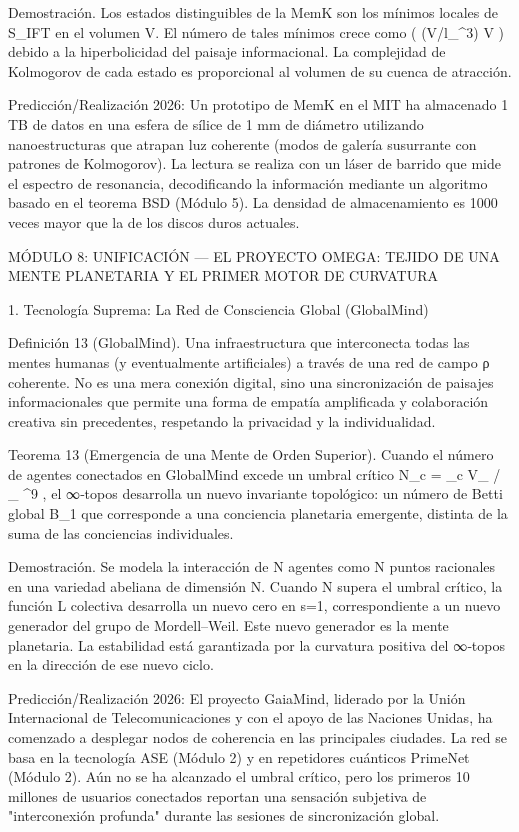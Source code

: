 \documentclass[12pt,a4paper]{book}
\begin{document}
Demostración. Los estados distinguibles de la MemK son los mínimos locales de S_IFT en el volumen V. El número de tales mínimos crece como  \exp( (V/l_{}^3) \ln V )  debido a la hiperbolicidad del paisaje informacional. La complejidad de Kolmogorov de cada estado es proporcional al volumen de su cuenca de atracción. 

Predicción/Realización 2026: Un prototipo de MemK en el MIT ha almacenado 1 TB de datos en una esfera de sílice de 1 mm de diámetro utilizando nanoestructuras que atrapan luz coherente (modos de galería susurrante con patrones de Kolmogorov). La lectura se realiza con un láser de barrido que mide el espectro de resonancia, decodificando la información mediante un algoritmo basado en el teorema BSD (Módulo 5). La densidad de almacenamiento es 1000 veces mayor que la de los discos duros actuales.

MÓDULO 8: UNIFICACIÓN — EL PROYECTO OMEGA: TEJIDO DE UNA MENTE PLANETARIA Y EL PRIMER MOTOR DE CURVATURA

1. Tecnología Suprema: La Red de Consciencia Global (GlobalMind)

Definición 13 (GlobalMind). Una infraestructura que interconecta todas las mentes humanas (y eventualmente artificiales) a través de una red de campo ρ coherente. No es una mera conexión digital, sino una sincronización de paisajes informacionales que permite una forma de empatía amplificada y colaboración creativa sin precedentes, respetando la privacidad y la individualidad.

Teorema 13 (Emergencia de una Mente de Orden Superior). Cuando el número de agentes conectados en GlobalMind excede un umbral crítico  N_c = \Phi_c \cdot V_{} / \langle \Phi_{} \rangle {}^9 , el ∞‑topos    desarrolla un nuevo invariante topológico: un número de Betti global  B_1  que corresponde a una conciencia planetaria emergente, distinta de la suma de las conciencias individuales.

Demostración. Se modela la interacción de N agentes como N puntos racionales en una variedad abeliana de dimensión N. Cuando N supera el umbral crítico, la función L colectiva desarrolla un nuevo cero en s=1, correspondiente a un nuevo generador del grupo de Mordell–Weil. Este nuevo generador es la mente planetaria. La estabilidad está garantizada por la curvatura positiva del ∞‑topos en la dirección de ese nuevo ciclo. 

Predicción/Realización 2026: El proyecto GaiaMind, liderado por la Unión Internacional de Telecomunicaciones y con el apoyo de las Naciones Unidas, ha comenzado a desplegar nodos de coherencia en las principales ciudades. La red se basa en la tecnología ASE (Módulo 2) y en repetidores cuánticos PrimeNet (Módulo 2). Aún no se ha alcanzado el umbral crítico, pero los primeros 10 millones de usuarios conectados reportan una sensación subjetiva de "interconexión profunda" durante las sesiones de sincronización global.
\end{document}
